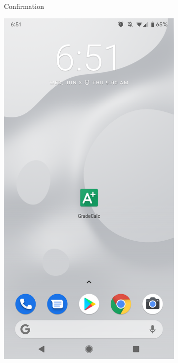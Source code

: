 \begin{figure}[ht!]
\begin{subfigure}[b]{0.25\textwidth-0.1cm}
        \caption{Confirmation}
        \label{fig:install-prompt}
    \end{subfigure}
    \hfill
    \begin{subfigure}[b]{0.25\textwidth-0.1cm}
        \centering
        \includegraphics[width=\textwidth]{media/screenshots/screenshot-install-homescreen.png}

\end{subfigure}
\end{figure}
